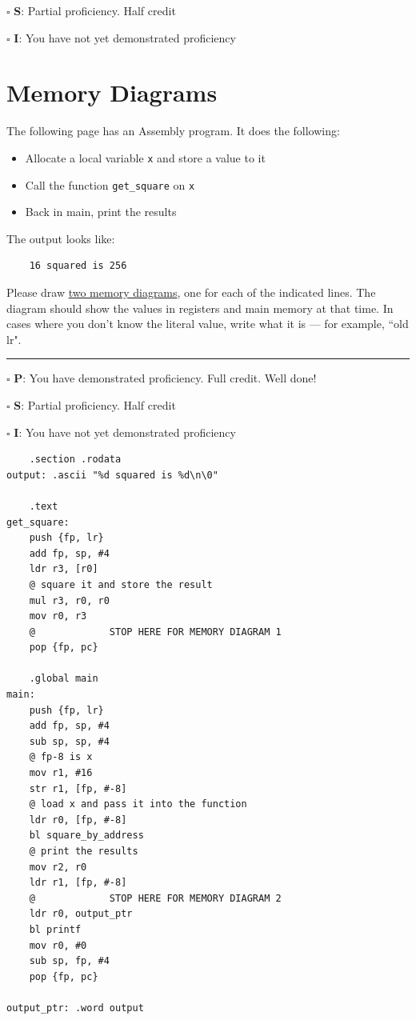 \documentclass[12pt]{article}
\begin{document}
$\square$ \textbf{S}: Partial proficiency. Half credit

$\square$ \textbf{I}: You have not yet demonstrated proficiency

\newpage



\section*{Memory Diagrams}

The following page has an Assembly program. It does the following:
\begin{itemize}
    \item Allocate a local variable \texttt{x} and store a value to it
    \item Call the function \texttt{get\_square} on \texttt{x}
    \item Back in main, print the results
\end{itemize}

The output looks like:
\begin{verbatim}
    16 squared is 256
\end{verbatim}

Please draw \underline{two memory diagrams}, one for each of the indicated lines. The diagram should show the values in registers and main memory at that time. In cases where you don't know the literal value, write what it is --- for example, ``old lr". 


\vfill

\rule[1ex]{\textwidth}{.1pt}

$\square$ \textbf{P}: You have demonstrated proficiency. Full credit. Well done!

$\square$ \textbf{S}: Partial proficiency. Half credit

$\square$ \textbf{I}: You have not yet demonstrated proficiency

\newpage

\begin{verbatim}
    .section .rodata
output: .ascii "%d squared is %d\n\0"

    .text
get_square:
    push {fp, lr}
    add fp, sp, #4
    ldr r3, [r0]
    @ square it and store the result
    mul r3, r0, r0
    mov r0, r3
    @             STOP HERE FOR MEMORY DIAGRAM 1
    pop {fp, pc}

    .global main
main: 
    push {fp, lr}
    add fp, sp, #4
    sub sp, sp, #4
    @ fp-8 is x
    mov r1, #16
    str r1, [fp, #-8]
    @ load x and pass it into the function
    ldr r0, [fp, #-8]
    bl square_by_address
    @ print the results
    mov r2, r0
    ldr r1, [fp, #-8]
    @             STOP HERE FOR MEMORY DIAGRAM 2
    ldr r0, output_ptr
    bl printf
    mov r0, #0
    sub sp, fp, #4
    pop {fp, pc}

output_ptr: .word output
\end{verbatim}
\end{document}
